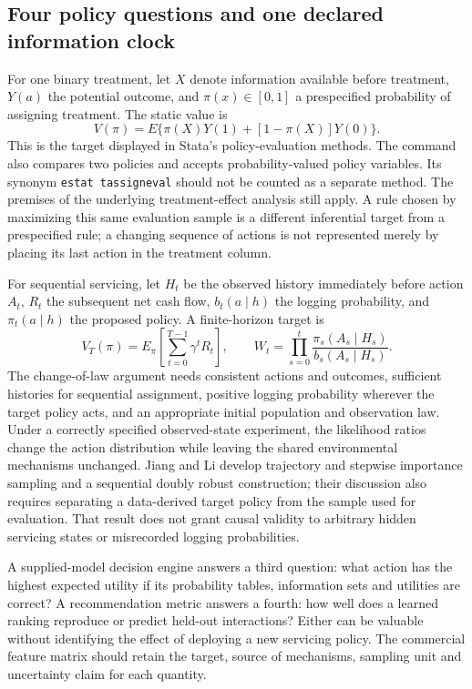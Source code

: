 \subsection{Four policy questions and one declared information clock}

For one binary treatment, let $X$ denote information available before treatment,
$Y(a)$ the potential outcome, and $\pi(x)\in[0,1]$ a prespecified probability
of assigning treatment. The static value is
\[
 V(\pi)=E\{\pi(X)Y(1)+[1-\pi(X)]Y(0)\}.
\]
This is the target displayed in Stata's policy-evaluation methods. The
command also compares two policies and accepts probability-valued policy
variables. Its synonym \texttt{estat tassigneval} should not be counted as
a separate method. The premises of the underlying treatment-effect analysis
still apply. A rule chosen by maximizing this same evaluation sample is a
different inferential target from a prespecified rule; a changing sequence of
actions is not represented merely by placing its last action in the treatment
column. \citep{exec13_ch_stata}

For sequential servicing, let $H_t$ be the observed history immediately before
action $A_t$, $R_t$ the subsequent net cash flow, $b_t(a\mid h)$ the logging
probability, and $\pi_t(a\mid h)$ the proposed policy. A finite-horizon target is
\[
 V_T(\pi)=E_\pi\left[\sum_{t=0}^{T-1}\gamma^tR_t\right],\qquad
 W_t=\prod_{s=0}^t\frac{\pi_s(A_s\mid H_s)}{b_s(A_s\mid H_s)}.
\]
The change-of-law argument needs consistent actions and outcomes, sufficient
histories for sequential assignment, positive logging probability wherever
the target policy acts, and an appropriate initial population and observation
law. Under a correctly specified observed-state experiment, the likelihood
ratios change the action distribution while leaving the shared environmental
mechanisms unchanged. Jiang and Li develop trajectory and stepwise importance
sampling and a sequential doubly robust construction; their discussion also
requires separating a data-derived target policy from the sample used for
evaluation. That result does not grant causal validity to arbitrary hidden
servicing states or misrecorded logging probabilities. \citep{jiang2016}

A supplied-model decision engine answers a third question: what action has
the highest expected utility if its probability tables, information sets and
utilities are correct? A recommendation metric answers a fourth: how well
does a learned ranking reproduce or predict held-out interactions? Either
can be valuable without identifying the effect of deploying a new servicing
policy. The commercial feature matrix should retain the target, source of
mechanisms, sampling unit and uncertainty claim for each quantity.


